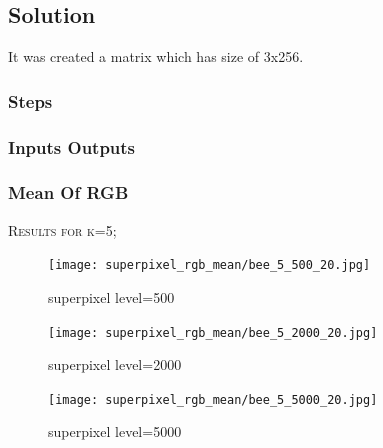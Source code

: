 \documentclass[12pt]{article}
\begin{document}
\subsection{Solution}
It was created a matrix which has size of 3x256.
\subsubsection{Steps}



\subsubsection{Inputs Outputs}

\subsubsection*{Mean Of RGB}
\begin{minipage}{\linewidth}
\centering
	\textsc{\large Results for k=5;}\\[0.1 cm]  
	\begin{minipage}{0.45\linewidth}
		\begin{figure} [H]
			\centering
			 \texttt{[image: superpixel\_rgb\_mean/bee\_5\_500\_20.jpg]}
	 		\caption{superpixel level=500}
		\end{figure}
	\end{minipage}
	\hspace{0.05\linewidth}
	\begin{minipage}{0.45\linewidth}
			\begin{figure} [H]
				\centering
				 \texttt{[image: superpixel\_rgb\_mean/bee\_5\_2000\_20.jpg]}
	 			\caption{superpixel level=2000}
			\end{figure}
	\end{minipage}
	\hspace{0.05\linewidth}
	\begin{minipage}{0.45\linewidth}
		\begin{figure} [H]
			\centering
			 \texttt{[image: superpixel\_rgb\_mean/bee\_5\_5000\_20.jpg]}
	 		\caption{superpixel level=5000}
		\end{figure}
	\end{minipage}
\end{minipage}
\end{document}
